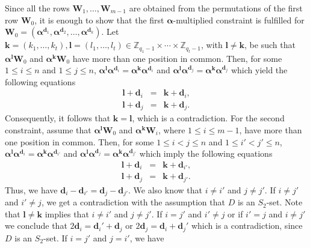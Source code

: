 \documentclass[journal,draftclsnofoot,onecolumn,12pt,twoside]{IEEEtran}
\begin{document}
\begin{IEEEproof}
Since all the rows $\mathbf{W}_1,\ldots,\mathbf{W}_{m-1}$ are obtained from the permutations of the first row $\mathbf{W}_0$, it is enough to show that the first $\boldsymbol{\alpha}$-multiplied constraint is fulfilled for  $\mathbf{W}_0=(\boldsymbol{\alpha}^{\mathbf{d}_1},\boldsymbol{\alpha}^{\mathbf{d}_2},\ldots,\boldsymbol{\alpha}^{\mathbf{d}_k})$. Let $\mathbf{k}=(k_1,\ldots,k_t),\mathbf{l}=(l_1,\ldots,l_t)\in\mathbb{Z}_{q_1-1}\times\cdots \times \mathbb{Z}_{q_t-1}$, with $\mathbf{l}\neq \mathbf{k}$, be such that $\boldsymbol{\alpha}^{\mathbf{l}}\mathbf{W}_0$ and $\boldsymbol{\alpha}^{\mathbf{k} }\mathbf{W}_0$ have more than one position in common. Then, for some $1\leq i\leq n$ and $1\leq  j\leq n$, $\boldsymbol{\alpha}^{\mathbf{l}}\boldsymbol{\alpha}^{\mathbf{d}_i}=\boldsymbol{\alpha}^{\mathbf{k}} \boldsymbol{\alpha}^{\mathbf{d}_{i}}$ and  $\boldsymbol{\alpha}^{\mathbf{l}}\boldsymbol{\alpha}^{\mathbf{d}_j}=\boldsymbol{\alpha}^{\mathbf{k}} \boldsymbol{\alpha}^{\mathbf{d}_{j}}$ which yield the following equations
\begin{eqnarray*}
\mathbf{l}+\mathbf{d}_{i}&=&\mathbf{k}+\mathbf{d}_{i},\\
\mathbf{l}+\mathbf{d}_{j}&=&\mathbf{k}+\mathbf{d}_{j}.
\end{eqnarray*}
Consequently, it follows that $\mathbf{k}=\mathbf{l}$, which is a contradiction. For the second constraint, assume that $\boldsymbol{\alpha}^{\mathbf{l}}\mathbf{W}_0$ and $\boldsymbol{\alpha}^{\mathbf{k}} \mathbf{W}_i$, where $1\leq i\leq m-1$, have more than one position in common.
Then, for some $1\leq i<j\leq n$ and $1\leq  i'< j'\leq n$, $\boldsymbol{\alpha}^{\mathbf{l}}\boldsymbol{\alpha}^{\mathbf{d}_i}=\boldsymbol{\alpha}^{\mathbf{k}} \boldsymbol{\alpha}^{\mathbf{d}_{i'}}$ and  $\boldsymbol{\alpha}^{\mathbf{l}}\boldsymbol{\alpha}^{\mathbf{d}_j}=\boldsymbol{\alpha}^{\mathbf{k}} \boldsymbol{\alpha}^{\mathbf{d}_{j'}}$ which imply the following equations
 \begin{eqnarray*}
\mathbf{l}+\mathbf{d}_{i}&=&\mathbf{k}+\mathbf{d}_{i'},\\
\mathbf{l}+\mathbf{d}_{j}&=&\mathbf{k}+\mathbf{d}_{j'}.
\end{eqnarray*}
Thus, we have $\mathbf{d}_i-\mathbf{d}_{i'}=\mathbf{d}_j-\mathbf{d}_{j'}$. We also know that $i\neq i'$ and $j\neq j'$. If $i\neq j'$ and $i'\neq j$, we get a contradiction with the assumption that $D$ is an $S_2$-set. Note that $\mathbf{l}\neq \mathbf{k}$ implies that $i\neq i'$ and $j\neq j'$. If $i=j'$ and $i'\neq j$ or if $i'=j$ and $i\neq j'$ we conclude that $2\mathbf{d}_i=\mathbf{d}_i'+\mathbf{d}_j$ or $2\mathbf{d}_j=\mathbf{d}_i+\mathbf{d}_j'$ which is a contradiction, since $D$ is an $S_2$-set. If $i=j'$ and $j=i'$, we have

\end{IEEEproof}
\end{document}
